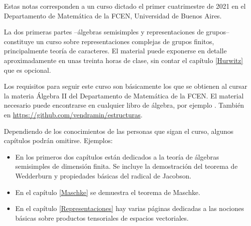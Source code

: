 \preface

Estas notas corresponden a un curso dictado el primer cuatrimestre de 2021 en 
el Departamento de Matemática de la FCEN, Universidad de Buenos Aires. 

La dos primeras partes --álgebras semisimples y representaciones de grupos-- 
constituye un curso sobre representaciones complejas 
de grupos finitos, principalmente teoría de caracteres. El material 
puede exponerse en detalle aproximadamente en unas treinta horas 
de clase, sin contar el capítulo \ref{Hurwitz}  
que es opcional. 

Los requisitos para seguir este curso son básicamente los
que se obtienen al cursar la materia Álgebra II del 
Departamento de Matemática de la FCEN. El material 
necesario puede encontrarse en cualquier libro de álgebra, 
por ejemplo \cite{MR600654}.
También en \url{https://github.com/vendramin/estructuras}.

Dependiendo
de los conocimientos de las personas que sigan el curso, 
algunos capítulos podrán omitirse. Ejemplos: 

\begin{itemize}
    \item En los primeros dos capítulos están dedicados a la teoría de álgebras semisimples de dimensión finita. Se incluye la demostración del teorema de Wedderburn y propiedades básicas del radical de Jacobson. 
    \item En el capítulo \ref{Maschke} se demuestra el teorema de Maschke. 
    \item En el capítulo \ref{Representaciones} hay varias páginas dedicadas a las nociones básicas sobre
    productos tensoriales de espacios vectoriales. 
\end{itemize}



